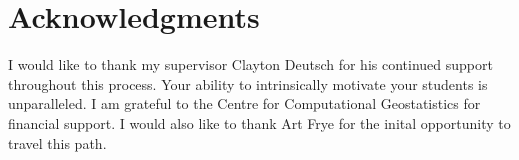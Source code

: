 
\chapter*{Acknowledgments}

I would like to thank my supervisor Clayton Deutsch for his continued support throughout this process. Your ability to intrinsically motivate your students is unparalleled. I am grateful to the Centre for Computational Geostatistics for financial support. I would also like to thank Art Frye for the inital opportunity to travel this path.